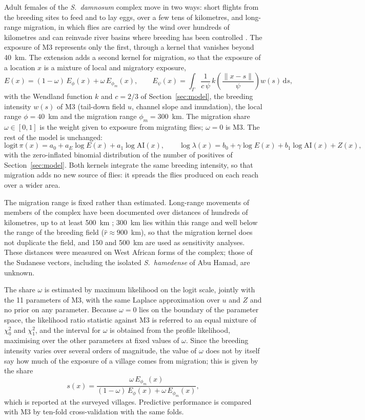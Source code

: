 \documentclass[11pt,a4paper]{article}
\newcommand{\dd}{\mathrm{d}}
\newcommand{\AI}{\mathrm{AI}}
\begin{document}
Adult females of the \textit{S.~damnosum} complex move in two ways: short flights from the breeding sites to feed and to lay eggs, over a few tens of kilometres, and long-range migration, in which flies are carried by the wind over hundreds of kilometres and can reinvade river basins where breeding has been controlled \citep{carnaghi2024}. The exposure of M3 represents only the first, through a kernel that vanishes beyond 40~km. The extension adds a second kernel for migration, so that the exposure of a location $x$ is a mixture of local and migratory exposure,
\[
E(x) = (1 - \omega)\, E_{\phi}(x) + \omega\, E_{\phi_m}(x), \qquad
E_{\psi}(x) = \int_\Gamma \frac{1}{c\,\psi}\, k\!\left(\frac{\lVert x - s\rVert}{\psi}\right) w(s)\, \dd s,
\]
with the Wendland function $k$ and $c = 2/3$ of Section~\ref{sec:model}, the breeding intensity $w(s)$ of M3 (tail-down field $u$, channel slope and inundation), the local range $\phi = 40$~km and the migration range $\phi_m = 300$~km. The migration share $\omega \in [0, 1]$ is the weight given to exposure from migrating flies; $\omega = 0$ is M3. The rest of the model is unchanged:
\[
\mathrm{logit}\,\pi(x) = a_0 + a_E \log E(x) + a_1 \log \AI(x), \qquad
\log \lambda(x) = b_0 + \gamma \log E(x) + b_1 \log \AI(x) + Z(x),
\]
with the zero-inflated binomial distribution of the number of positives of Section~\ref{sec:model}. Both kernels integrate the same breeding intensity, so that migration adds no new source of flies: it spreads the flies produced on each reach over a wider area.

The migration range is fixed rather than estimated. Long-range movements of members of the complex have been documented over distances of hundreds of kilometres, up to at least 500~km \citep{carnaghi2024}; 300~km lies within this range and well below the range of the breeding field ($\hat r \approx 900$~km), so that the migration kernel does not duplicate the field, and 150 and 500~km are used as sensitivity analyses. These distances were measured on West African forms of the complex; those of the Sudanese vectors, including the isolated \textit{S.~hamedense} of Abu Hamad, are unknown.

The share $\omega$ is estimated by maximum likelihood on the logit scale, jointly with the 11 parameters of M3, with the same Laplace approximation over $u$ and $Z$ and no prior on any parameter. Because $\omega = 0$ lies on the boundary of the parameter space, the likelihood ratio statistic against M3 is referred to an equal mixture of $\chi^2_0$ and $\chi^2_1$, and the interval for $\omega$ is obtained from the profile likelihood, maximising over the other parameters at fixed values of $\omega$. Since the breeding intensity varies over several orders of magnitude, the value of $\omega$ does not by itself say how much of the exposure of a village comes from migration; this is given by the share
\[
s(x) = \frac{\omega\, E_{\phi_m}(x)}{(1 - \omega)\, E_{\phi}(x) + \omega\, E_{\phi_m}(x)},
\]
which is reported at the surveyed villages. Predictive performance is compared with M3 by ten-fold cross-validation with the same folds.
\end{document}
